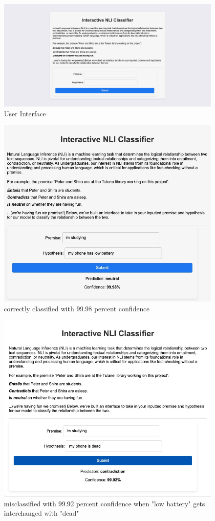 \documentclass[11pt,a4paper]{article}
\begin{document}
\begin{figure}
    \centering
    \includegraphics[width=1\linewidth]{Interface.jpeg}
    \caption{User Interface}
    \label{fig:enter-label}
\end{figure}
\begin{figure}
    \centering
    \includegraphics[width=0.75\linewidth]{Example1.jpeg}
    \caption{correctly classified with 99.98 percent confidence}
    \label{fig:enter-label}
\end{figure}
\begin{figure}
    \centering
    \includegraphics[width=0.75\linewidth]{Example2.jpeg}
    \caption{misclassified with 99.92 percent confidence when "low battery" gets interchanged with "dead"}
    \label{fig:enter-label}
\end{figure}
\end{document}
